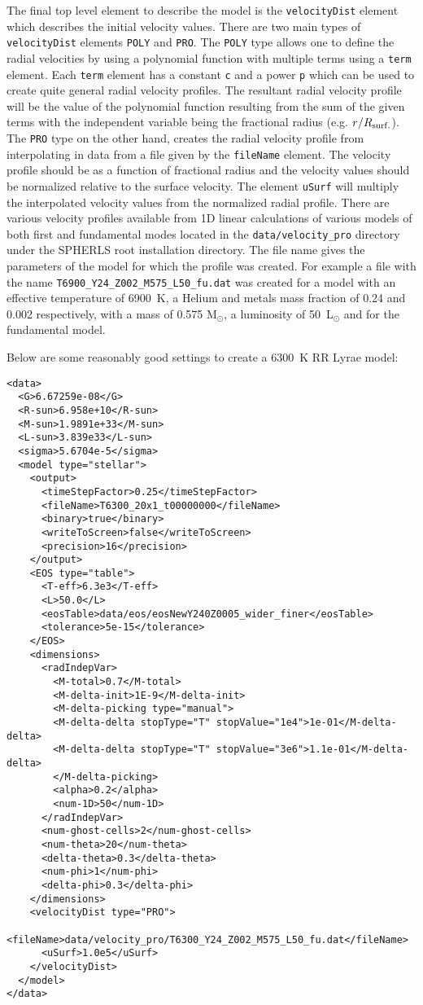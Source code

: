 \documentclass[12pt,a4paper]{book}
\begin{document}
The final top level element to describe the model is the {\tt velocityDist} element which describes the initial velocity values. There are two main types of {\tt velocityDist} elements {\tt POLY} and {\tt PRO}. The {\tt POLY} type allows one to define the radial velocities by using a polynomial function with multiple terms using a {\tt term} element. Each {\tt term} element has a constant {\tt c} and a power {\tt p} which can be used to create quite general radial velocity profiles. The resultant radial velocity profile will be the value of the polynomial function resulting from the sum of the given terms with the independent variable being the fractional radius (e.g. $r/R_{\rm surf.}$). The {\tt PRO} type on the other hand, creates the radial velocity profile from interpolating in data from a file given by the {\tt fileName} element. The velocity profile should be as a function of fractional radius and the velocity values should be normalized relative to the surface velocity. The element {\tt uSurf} will multiply the interpolated velocity values from the normalized radial profile. There are various velocity profiles available from 1D linear calculations of various models of both first and fundamental modes located in the {\tt data/velocity\_pro} directory under the SPHERLS root installation directory. The file name gives the parameters of the model for which the profile was created. For example a file with the name {\tt T6900\_Y24\_Z002\_M575\_L50\_fu.dat} was created for a model with an effective temperature of 6900~K, a Helium and metals mass fraction of 0.24 and 0.002 respectively, with a mass of 0.575 M$_\odot$, a luminosity of 50~L$_\odot$ and for the fundamental model.

Below are some reasonably good settings to create a 6300~K RR Lyrae model:
\begin{verbatim}
<data>
  <G>6.67259e-08</G>
  <R-sun>6.958e+10</R-sun>
  <M-sun>1.9891e+33</M-sun>
  <L-sun>3.839e33</L-sun>
  <sigma>5.6704e-5</sigma>
  <model type="stellar">
    <output>
      <timeStepFactor>0.25</timeStepFactor>
      <fileName>T6300_20x1_t00000000</fileName>
      <binary>true</binary>
      <writeToScreen>false</writeToScreen>
      <precision>16</precision>
    </output>
    <EOS type="table">
      <T-eff>6.3e3</T-eff>
      <L>50.0</L>
      <eosTable>data/eos/eosNewY240Z0005_wider_finer</eosTable>
      <tolerance>5e-15</tolerance>
    </EOS>
    <dimensions>
      <radIndepVar>
        <M-total>0.7</M-total>
        <M-delta-init>1E-9</M-delta-init>
        <M-delta-picking type="manual">
        <M-delta-delta stopType="T" stopValue="1e4">1e-01</M-delta-delta>
        <M-delta-delta stopType="T" stopValue="3e6">1.1e-01</M-delta-delta>
        </M-delta-picking>
        <alpha>0.2</alpha>
        <num-1D>50</num-1D>
      </radIndepVar>
      <num-ghost-cells>2</num-ghost-cells>
      <num-theta>20</num-theta>
      <delta-theta>0.3</delta-theta>
      <num-phi>1</num-phi>
      <delta-phi>0.3</delta-phi>
    </dimensions>
    <velocityDist type="PRO">
      <fileName>data/velocity_pro/T6300_Y24_Z002_M575_L50_fu.dat</fileName>
      <uSurf>1.0e5</uSurf>
    </velocityDist>
  </model>
</data>
\end{verbatim}
\end{document}
